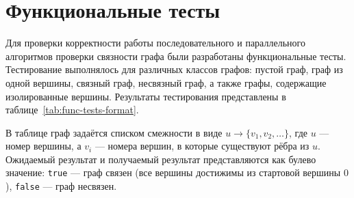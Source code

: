 \section{Функциональные тесты}



Для проверки корректности работы последовательного и параллельного алгоритмов проверки связности графа были разработаны функциональные тесты.
Тестирование выполнялось для различных классов графов: пустой граф, граф из одной вершины, связный граф, несвязный граф, а также графы, содержащие изолированные вершины.
Результаты тестирования представлены в таблице~\ref{tab:func-tests-format}.

В таблице граф задаётся списком смежности в виде
$u \rightarrow \{v_1, v_2, \dots\}$, где $u$ --- номер вершины, а $v_i$ --- номера вершин, в которые существуют рёбра из $u$.
Ожидаемый результат и получаемый результат представляются как булево значение:
\texttt{true} --- граф связен (все вершины достижимы из стартовой вершины $0$),
\texttt{false} --- граф несвязен.


